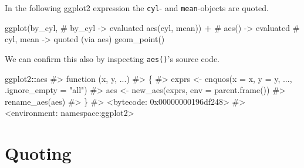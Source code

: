 \documentclass[
]{krantz}
\makeatletter
\newenvironment{Shaded}{\begin{snugshade}}{\end{snugshade}}
\newcommand{\CommentTok}[1]{\textcolor[rgb]{0.56,0.35,0.01}{\textit{#1}}}
\newcommand{\KeywordTok}[1]{\textcolor[rgb]{0.13,0.29,0.53}{\textbf{#1}}}
\newcommand{\NormalTok}[1]{#1}
\newcommand{\OperatorTok}[1]{\textcolor[rgb]{0.81,0.36,0.00}{\textbf{#1}}}
\newcommand{\StringTok}[1]{\textcolor[rgb]{0.31,0.60,0.02}{#1}}
\newenvironment{kframe}{%
\medskip{}
\setlength{\fboxsep}{.8em}
 \def\at@end@of@kframe{}%
 \ifinner\ifhmode%
  \def\at@end@of@kframe{\end{minipage}}%
  \begin{minipage}{\columnwidth}%
 \fi\fi%
 \def\FrameCommand##1{\hskip\@totalleftmargin \hskip-\fboxsep
 \colorbox{shadecolor}{##1}\hskip-\fboxsep
     \hskip-\linewidth \hskip-\@totalleftmargin \hskip\columnwidth}%
 \MakeFramed {\advance\hsize-\width
   \@totalleftmargin\z@ \linewidth\hsize
   \@setminipage}}%
 {\par\unskip\endMakeFramed%
 \at@end@of@kframe}
\renewenvironment{Shaded}{\begin{kframe}}{\end{kframe}}
\renewcommand{\KeywordTok} [1]{\textcolor[rgb]{0.00,0.44,0.13}{{#1}}}
\renewcommand{\StringTok}  [1]{\textcolor[rgb]{0.25,0.44,0.63}{{#1}}}
\renewcommand{\CommentTok} [1]{\textcolor[rgb]{0.38,0.63,0.69}{{#1}}}
\renewcommand{\NormalTok}  [1]{{#1}}
\makeatother
\begin{document}
\begin{Shaded}
\end{Shaded}

In the following ggplot2 expression the \texttt{cyl}- and \texttt{mean}-objects are quoted.

\begin{Shaded}
\begin{Highlighting}[]
\KeywordTok{ggplot}\NormalTok{(by_cyl,            }\CommentTok{# by_cyl -> evaluated}
       \KeywordTok{aes}\NormalTok{(cyl, mean)) }\OperatorTok{+}\StringTok{  }\CommentTok{# aes() -> evaluated}
\StringTok{  }\CommentTok{# cyl, mean -> quoted (via aes)}
\StringTok{  }\KeywordTok{geom_point}\NormalTok{() }
\end{Highlighting}
\end{Shaded}

We can confirm this also by inspecting \texttt{aes()}'s source code.

\begin{Shaded}
\begin{Highlighting}[]
\NormalTok{ggplot2}\OperatorTok{::}\NormalTok{aes}
\CommentTok{#> function (x, y, ...) }
\CommentTok{#> \{}
\CommentTok{#>     exprs <- enquos(x = x, y = y, ..., .ignore_empty = "all")}
\CommentTok{#>     aes <- new_aes(exprs, env = parent.frame())}
\CommentTok{#>     rename_aes(aes)}
\CommentTok{#> \}}
\CommentTok{#> <bytecode: 0x00000000196df248>}
\CommentTok{#> <environment: namespace:ggplot2>}
\end{Highlighting}
\end{Shaded}

\hypertarget{quoting}{%
\section{Quoting}\label{quoting}}
\end{document}
